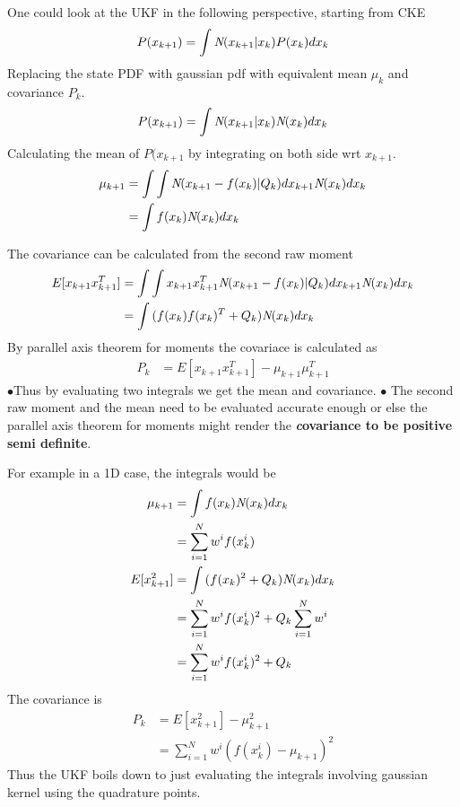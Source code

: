 \documentclass[landscape]{slides}
\begin{document}
\begin{slide}
 One could look at the UKF in the following perspective, starting from CKE
\begin{align*}
	P(x_{k+1})=\int{{\bf\emph{N}}(x_{k+1}|x_k)P(x_k)}dx_k
	\end{align*}
		Replacing the state PDF with gaussian pdf with equivalent mean $\mu_k$ and covariance $P_k$. 
		\begin{align*}
	P(x_{k+1})=\int{{\bf\emph{N}}(x_{k+1}|x_k){\bf\emph{N}}(x_k)}dx_k
	\end{align*}
	Calculating the mean of $P(x_{k+1}$ by integrating on both side wrt $x_{k+1}$.
		\begin{align*}
	\mu_{k+1}&=\int{\int{{\bf\emph{N}}(x_{k+1}-f(x_k)|Q_k)}dx_{k+1}{\bf\emph{N}}(x_k)}dx_k\\
	&=\int{f(x_k){\bf\emph{N}}(x_k)}dx_k
	\end{align*}
		\end{slide}
\begin{slide}
The covariance can be calculated from the second raw moment
			\begin{align*}	E[x_{k+1}x_{k+1}^T]&=\int{\int{x_{k+1}x_{k+1}^T{\bf\emph{N}}(x_{k+1}-f(x_k)|Q_k)}dx_{k+1}{\bf\emph{N}}(x_k)}dx_k\\
	&=\int{(f(x_k)f(x_k)^T+Q_k){\bf\emph{N}}(x_k)}dx_k
	\end{align*}
	By parallel axis theorem for moments the covariace is calculated as
	\begin{align*}
	P_k&=E[x_{k+1}x_{k+1}^T]-\mu_{k+1}\mu_{k+1}^T
	\end{align*}
	$\bullet$Thus by evaluating two integrals we get the mean and covariance.\newline\newline
	$\bullet$ The second raw moment and the mean need to be evaluated accurate enough or else the parallel axis theorem for moments might render the {\bf {\emph covariance to be positive semi definite}}.
		\end{slide}
\begin{slide}
	For example in a 1D case, the integrals would be
	 \begin{align*}
	 \mu_{k+1}&=\int{f(x_k){\bf\emph{N}}(x_k)}dx_k\\
	 &=\sum_{i=1}^{N}w^if(x_k^i)\\
	E[x_{k+1}^2]&=\int{(f(x_k)^2+Q_k){\bf\emph{N}}(x_k)}dx_k\\
	&=\sum_{i=1}^{N}w^if(x_k^i)^2+Q_k\sum_{i=1}^{N}w^i\\
	&=\sum_{i=1}^{N}w^if(x_k^i)^2+Q_k
	\end{align*}
	The covariance is
	\begin{align*}
	P_k&=E[x_{k+1}^2]-\mu_{k+1}^2\\
	&=\sum_{i=1}^{N}w^i(f(x_k^i)-\mu_{k+1})^2
	\end{align*} 
	Thus the UKF boils down to just evaluating the integrals involving gaussian kernel using the quadrature points.
		\end{slide}
\end{document}
